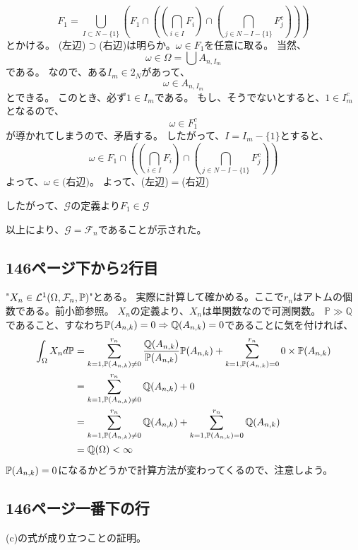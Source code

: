\begin{enumerate}
      \[
        F_1 = \bigcup_{I \subset N-\{1\}} \left( F_1 \cap \left( \left(\bigcap_{i \in I}F_i \right) \cap \left(\bigcap_{j \in N-I-\{1\}}F_j^c\right) \right) \right)
      \]
      とかける。
      (左辺)$ \supset $(右辺)は明らか。$\omega \in F_1$を任意に取る。
      当然、
      \[
        \omega \in \Omega = \bigcup A_{n,I_m}
      \]
      である。
      なので、ある$I_m \in 2_N$があって、
      \[
        \omega  \in A_{n,I_m}
      \]
      とできる。
      このとき、必ず$1 \in I_m$である。
      もし、そうでないとすると、$1 \in I_m^c$となるので、
      \[
        \omega \in F_1^c
      \]
      が導かれてしまうので、矛盾する。
      したがって、$I = I_m - \{ 1 \}$とすると、
      \[
        \omega \in  F_1 \cap \left( \left(\bigcap_{i \in I}F_i \right) \cap \left(\bigcap_{j \in N-I-\{1\}}F_j^c\right) \right)
      \]
      よって、$\omega \in \text{(右辺)}$。
      よって、(左辺)$ = $(右辺)

      したがって、$\mathcal{G}$の定義より$F_1 \in \mathcal{G}$
    \end{enumerate}
    以上により、$\mathcal{G} = \mathcal{F}_n$であることが示された。

  \subsection{146ページ下から2行目}
    "$X_n \in \mathcal{L}^1(\Omega, \mathcal{F}_n, {\mathbb{P}})$"とある。
    実際に計算して確かめる。ここで$r_n$はアトムの個数である。前小節参照。
    $X_n$の定義より、$X_n$は単関数なので可測関数。
    $\mathbb{P}\gg\mathbb{Q}$であること、すなわち${\mathbb{P}}(A_{n,k}) = 0 \Rightarrow \mathbb{Q}(A_{n,k}) = 0$であることに気を付ければ、
    \begin{align*}
      \int_{\Omega} X_n d{\mathbb{P}} &= \sum_{k=1,{\mathbb{P}}(A_{n,k})\neq 0}^{r_n} \frac{\mathbb{Q}(A_{n,k})}{{\mathbb{P}}(A_{n,k})}{\mathbb{P}}(A_{n,k}) + \sum_{k=1,{\mathbb{P}}(A_{n,k})= 0}^{r_n} 0 \times {\mathbb{P}}(A_{n,k})\\
      &= \sum_{k=1,{\mathbb{P}}(A_{n,k})\neq 0}^{r_n} \mathbb{Q}(A_{n,k}) + 0\\
      &= \sum_{k=1,{\mathbb{P}}(A_{n,k})\neq 0}^{r_n} \mathbb{Q}(A_{n,k}) + \sum_{k=1,{\mathbb{P}}(A_{n,k})= 0}^{r_n} \mathbb{Q}(A_{n,k})\\
      &= \mathbb{Q}(\Omega) < \infty
    \end{align*}
    ${\mathbb{P}}(A_{n,k})= 0$になるかどうかで計算方法が変わってくるので、注意しよう。

  \subsection{146ページ一番下の行}
    (c)の式が成り立つことの証明。

